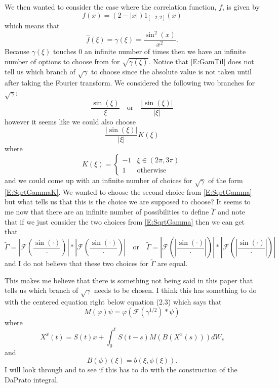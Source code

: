 \documentclass{article}
\numberwithin{equation}{section}
\begin{document}
We then wanted to consider the case where the correlation function, $f$, is given by 
	\[
		f(x) =(2-|x|)1_{[-2,2]}(x)
	\]
which means that 
	\[
		\hat{f}(\xi) = \gamma(\xi) = \frac{\sin^2(x)}{x^2}.
	\]
Because $\gamma(\xi)$ touches $0$ an infinite number of times then we have an infinite number of options to choose from for $\sqrt{\gamma(\xi)}$. Notice that \eqref{E:GamTil} does not tell us which branch of $\sqrt{\gamma}$ to choose since the absolute value is not taken until after taking the Fourier transform. We considered the following two branches for $\sqrt{\gamma}$:
	\begin{equation}\label{E:SqrtGamma}
		\frac{\sin(\xi)}{\xi} \quad \text{or} \quad \frac{|\sin(\xi)|}{|\xi|}
	\end{equation}
however it seems like we could also choose 
	\begin{equation}\label{E:SqrtGammaK}
		\frac{|\sin(\xi)|}{|\xi|} K(\xi)
	\end{equation}
where 
	\[ K(\xi) = 
		\begin{cases}
			-1 & \xi \in (2\pi, 3\pi)
			\\ 1 & \text{otherwise}
		\end{cases}
	\]
and we could come up with an infinite number of choices for $\sqrt{\gamma}$ of the form \eqref{E:SqrtGammaK}. We wanted to choose the second choice from \eqref{E:SqrtGamma} but what tells us that this is the choice we are supposed to choose? It seems to me now that there are an infinite number of possibilities to define $\tilde{\Gamma}$ and note that if we just consider the two choices from \eqref{E:SqrtGamma} then we can get that 
	\[
		\tilde{\Gamma} = \left| \mathcal{F}\left(\frac{\sin(\cdot)}{\cdot} \right) \right|* \left| \mathcal{F}\left(\frac{\sin(\cdot)}{\cdot} \right) \right| 
			\quad	\text{or}	\quad
		\tilde{\Gamma} = \left| \mathcal{F}\left(\left|\frac{\sin(\cdot)}{\cdot} \right|\right) \right|* \left| \mathcal{F}\left(\left|\frac{\sin(\cdot)}{\cdot} \right| \right) \right| 
	\] 
and I do not believe that these two choices for $\tilde{\Gamma}$ are equal. 

This makes me believe that there is something not being said in this paper that tells us which branch of $\sqrt{\gamma}$ needs to be chosen. I think this has something to do with the centered equation right below equation (2.3) \cite{TZ98} which says that 
	\begin{equation}\label{E:SqrtGammaM}
		M(\varphi)\psi = \varphi(\mathcal{F}(\gamma^{1/2}) * \psi)
	\end{equation}
where
	\[
		X^x(t) = S(t)x + \int_0^t S(t-s)M(B(X^x(s))) dW_s
	\]
and 
	\[
		B(\phi)(\xi) = b(\xi,\phi(\xi)).
	\]
I will look through \cite{DZ92} and \cite{DZp92} to see if this has to do with the construction of the DaPrato integral. 
\end{document}
